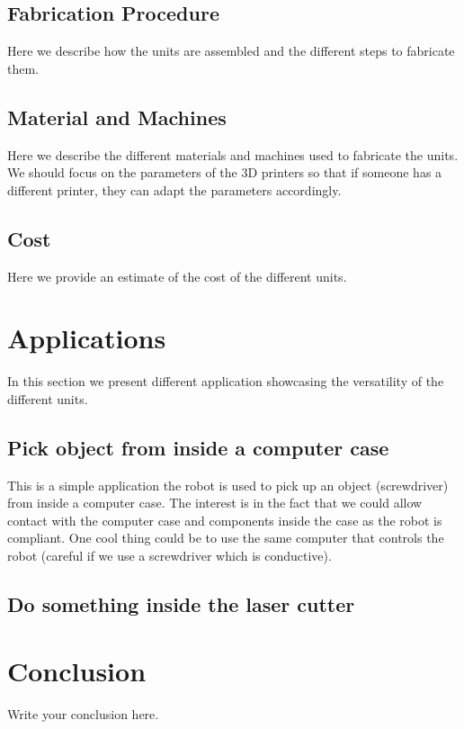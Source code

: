 \documentclass[12pt]{article}
\begin{document}
\subsection{Fabrication Procedure}
Here we describe how the units are assembled and the different steps to fabricate them.

\subsection{Material and Machines}
Here we describe the different materials and machines used to fabricate the units.
We should focus on the parameters of the 3D printers so that if someone has a different printer, they can adapt the parameters accordingly.

\subsection{Cost}
Here we provide an estimate of the cost of the different units.

\section{Applications}
In this section we present different application showcasing the versatility of the different units.

\subsection{Pick object from inside a computer case}
This is a simple application the robot is used to pick up an object (screwdriver) from inside a computer case.
The interest is in the fact that we could allow contact with the computer case and components inside the case as the robot is compliant.
One cool thing could be to use the same computer that controls the robot (careful if we use a screwdriver which is conductive).

\subsection{Do something inside the laser cutter}



\section{Conclusion}
Write your conclusion here.
\end{document}
